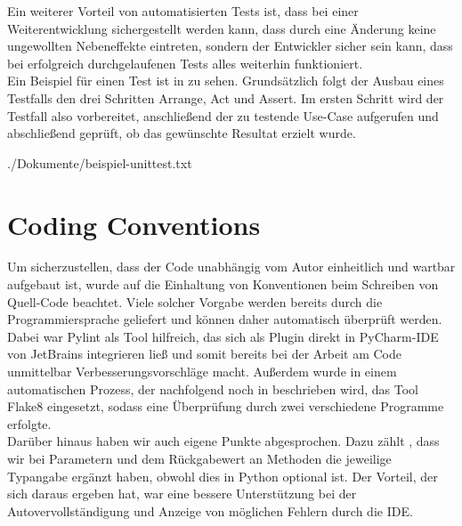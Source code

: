 Ein weiterer Vorteil von automatisierten Tests ist, dass bei einer Weiterentwicklung sichergestellt werden kann, dass
durch eine Änderung keine ungewollten Nebeneffekte eintreten, sondern der Entwickler sicher sein kann, dass bei erfolgreich durchgelaufenen
Tests alles weiterhin funktioniert. \\

Ein Beispiel für einen Test ist in  zu sehen.
Grundsätzlich folgt der Ausbau eines Testfalls den drei Schritten Arrange, Act und Assert.
Im ersten Schritt wird der Testfall also vorbereitet, anschließend der zu testende Use-Case aufgerufen und abschließend
geprüft, ob das gewünschte Resultat erzielt wurde.


{./Dokumente/beispiel-unittest.txt}

\section{Coding Conventions}
\label{sec:code-conventions}

Um sicherzustellen, dass der Code unabhängig vom Autor einheitlich und wartbar aufgebaut ist, wurde auf die Einhaltung
von Konventionen beim Schreiben von Quell-Code beachtet.
Viele solcher Vorgabe werden bereits durch die Programmiersprache geliefert und können daher automatisch überprüft
werden.
Dabei war Pylint als Tool hilfreich, das sich als Plugin direkt in PyCharm-IDE von JetBrains integrieren ließ und somit
bereits bei der Arbeit am Code unmittelbar Verbesserungsvorschläge macht.
Außerdem wurde in einem automatischen Prozess, der nachfolgend noch in  beschrieben wird,
das Tool Flake8 eingesetzt, sodass eine Überprüfung durch zwei verschiedene Programme erfolgte. \\

Darüber hinaus haben wir auch eigene Punkte abgesprochen.
Dazu zählt \bspw, dass wir bei Parametern und dem Rückgabewert an Methoden die jeweilige Typangabe ergänzt haben, obwohl
dies in Python optional ist.
Der Vorteil, der sich daraus ergeben hat, war eine bessere Unterstützung bei der Autovervollständigung und Anzeige
von möglichen Fehlern durch die IDE.
